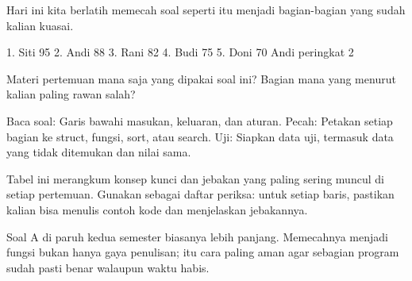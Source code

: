\documentclass[a4paper]{article}
\begin{document}
Hari ini kita berlatih memecah soal seperti itu menjadi bagian-bagian yang sudah kalian kuasai.

\begin{MKeluaran}[title={Tampilan yang diinginkan}]
1. Siti 95
2. Andi 88
3. Rani 82
4. Budi 75
5. Doni 70
Andi peringkat 2
\end{MKeluaran}
\begin{Tebak}
Materi pertemuan mana saja yang dipakai soal ini? Bagian mana yang menurut kalian paling rawan salah?
\end{Tebak}
\begin{Jawaban}
Baca soal: Garis bawahi masukan, keluaran, dan aturan. Pecah: Petakan setiap bagian ke struct, fungsi, sort, atau search. Uji: Siapkan data uji, termasuk data yang tidak ditemukan dan nilai sama.
\end{Jawaban}
Tabel ini merangkum konsep kunci dan jebakan yang paling sering muncul di setiap pertemuan. Gunakan sebagai daftar periksa: untuk setiap baris, pastikan kalian bisa menulis contoh kode dan menjelaskan jebakannya.

\par\vspace{4pt}\par\vspace{6pt}
Soal A di paruh kedua semester biasanya lebih panjang. Memecahnya menjadi fungsi bukan hanya gaya penulisan; itu cara paling aman agar sebagian program sudah pasti benar walaupun waktu habis.
\end{document}
